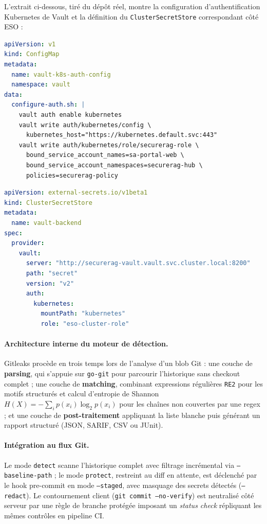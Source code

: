 L'extrait ci-dessous, tiré du dépôt réel, montre la configuration d'authentification Kubernetes de Vault et la définition du \texttt{ClusterSecretStore} correspondant côté ESO :

\begin{lstlisting}[language=yaml, caption={Extrait réel de la configuration d'authentification Kubernetes de Vault (\texttt{infra/k8s/security/vault/k8s-auth-config.yaml})}, label={lst:vault_k8s_auth_reel}]
apiVersion: v1
kind: ConfigMap
metadata:
  name: vault-k8s-auth-config
  namespace: vault
data:
  configure-auth.sh: |
    vault auth enable kubernetes
    vault write auth/kubernetes/config \
      kubernetes_host="https://kubernetes.default.svc:443"
    vault write auth/kubernetes/role/securerag-role \
      bound_service_account_names=sa-portal-web \
      bound_service_account_namespaces=securerag-hub \
      policies=securerag-policy
\end{lstlisting}

\begin{lstlisting}[language=yaml, caption={Extrait réel du ClusterSecretStore ESO relié à Vault (\texttt{infra/k8s/secrets/eso-cluster-secret-store.yaml})}, label={lst:eso_cluster_secret_store_reel}]
apiVersion: external-secrets.io/v1beta1
kind: ClusterSecretStore
metadata:
  name: vault-backend
spec:
  provider:
    vault:
      server: "http://securerag-vault.vault.svc.cluster.local:8200"
      path: "secret"
      version: "v2"
      auth:
        kubernetes:
          mountPath: "kubernetes"
          role: "eso-cluster-role"
\end{lstlisting}

\paragraph{Architecture interne du moteur de détection.} Gitleaks procède en trois temps lors de l'analyse d'un blob Git : une couche de \textbf{parsing}, qui s'appuie sur \texttt{go-git} pour parcourir l'historique sans checkout complet ; une couche de \textbf{matching}, combinant expressions régulières \texttt{RE2} pour les motifs structurés et calcul d'entropie de Shannon $H(X) = -\sum_{i} p(x_i) \log_2 p(x_i)$ pour les chaînes non couvertes par une regex ; et une couche de \textbf{post-traitement} appliquant la liste blanche puis générant un rapport structuré (JSON, SARIF, CSV ou JUnit).

\paragraph{Intégration au flux Git.} Le mode \texttt{detect} scanne l'historique complet avec filtrage incrémental via \texttt{--baseline-path} ; le mode \texttt{protect}, restreint au diff en attente, est déclenché par le hook pre-commit en mode \texttt{--staged}, avec masquage des secrets détectés (\texttt{--redact}). Le contournement client (\texttt{git commit --no-verify}) est neutralisé côté serveur par une règle de branche protégée imposant un \textit{status check} répliquant les mêmes contrôles en pipeline CI.

